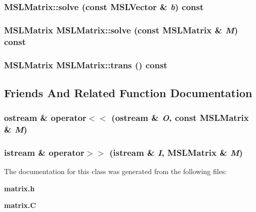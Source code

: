 \subsubsection{ MSLMatrix::solve (const {\bf MSLVector} \& {\em b}) const\hspace{0.3cm}{\tt  [inline]}}\label{classMSLMatrix_a14}


\subsubsection{\setlength{\rightskip}{0pt plus 5cm}MSLMatrix MSLMatrix::solve (const MSLMatrix \& {\em M}) const}\label{classMSLMatrix_a13}


\subsubsection{\setlength{\rightskip}{0pt plus 5cm}MSLMatrix MSLMatrix::trans () const}\label{classMSLMatrix_a10}




\subsection{Friends And Related Function Documentation}
\subsubsection{\setlength{\rightskip}{0pt plus 5cm}ostream \& operator$<$$<$ (ostream \& {\em O}, const MSLMatrix \& {\em M})\hspace{0.3cm}{\tt  [friend]}}\label{classMSLMatrix_l0}


\subsubsection{\setlength{\rightskip}{0pt plus 5cm}istream \& operator$>$$>$ (istream \& {\em I}, MSLMatrix \& {\em M})\hspace{0.3cm}{\tt  [friend]}}\label{classMSLMatrix_l1}




The documentation for this class was generated from the following files:\begin{CompactItemize}
\item 
{\bf matrix.h}\item 
{\bf matrix.C}\end{CompactItemize}
